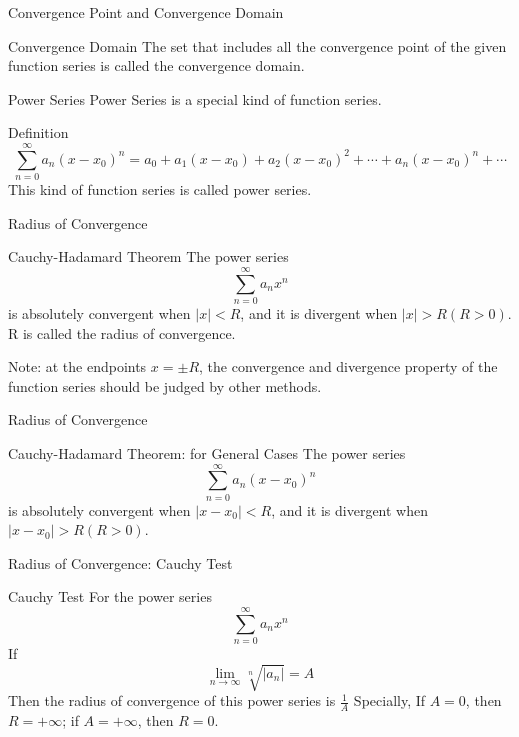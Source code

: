 \begin{frame}{Convergence Point and Convergence Domain}
    \begin{block}{Convergence Domain}
        The set that includes all the convergence point of the given function series is called the convergence domain.
    \end{block}
\end{frame}


\begin{frame}{Power Series}
    Power Series is a special kind of function series.
    \begin{block}{Definition}
        \[\sum\limits_{n=0}^{\infty} a_n(x-x_0)^n= a_0+ a_1 (x-x_0)+ a_2(x-x_0)^2 +\cdots +a_n(x-x_0)^n+\cdots\]
        This kind of function series is called power series.
    \end{block}

\end{frame}



\begin{frame}{Radius of Convergence}
    \begin{block}{Cauchy-Hadamard Theorem}
        The power series $$\sum\limits_{n=0}^{\infty}a_n x^n$$
        is absolutely convergent when $|x| < R$, and it is divergent when $|x| > R (R > 0)$. R is called the radius of convergence.
    \end{block}
    Note: at the endpoints $x=\pm R$, the convergence and divergence property of the function series should be judged by other methods.
\end{frame}


\begin{frame}{Radius of Convergence}
    \begin{block}{Cauchy-Hadamard Theorem: for General Cases}
        The power series $$\sum\limits_{n=0}^{\infty} a_n (x-x_0)^n$$
        is absolutely convergent when $|x - x_0| < R$, and it is divergent when $|x - x_0| > R (R > 0)$.
    \end{block}
\end{frame}


\begin{frame}{Radius of Convergence: Cauchy Test}
    \begin{block}{Cauchy Test}
        For the power series
        $$\sum\limits_{n=0}^{\infty}a_n x^n$$
        If
        $$\mathop{lim}\limits_{n\rightarrow \infty} \sqrt[n]{|a_n|}=A$$
        Then the radius of convergence of this power series is $\frac{1}{A}$
        Specially, If $A = 0$, then $R = +\infty$; if $A = +\infty$, then $R = 0$.
    \end{block}
\end{frame}


